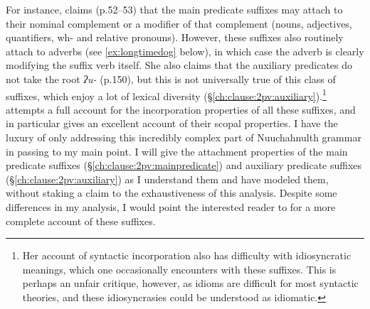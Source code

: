 For instance, \citeauthor{wojdak2005} claims (p.52--53) that the main predicate suffixes may attach to their nominal complement or a modifier of that complement (nouns, adjectives, quantifiers, wh- and relative pronouns). However, these suffixes also routinely attach to adverbs (see \ref{ex:longtimedog} below), in which case the adverb is clearly modifying the suffix verb itself. %
She also claims that the auxiliary predicates do not take the root \textit{ʔu-} (p.150), but this is not universally true of this class of suffixes, which enjoy a lot of lexical diversity (\S\ref{ch:clause:2pv:auxiliary}).\footnote{Her account of syntactic incorporation also has difficulty with idiosyncratic meanings, which one occasionally encounters with these suffixes. This is perhaps an unfair critique, however, as idioms are difficult for most syntactic theories, and these idiosyncrasies could be understood as idiomatic.} \citeauthor{wojdak2005} attempts a full account for the incorporation properties of all these suffixes, and in particular gives an excellent account of their scopal properties. I have the luxury of only addressing this incredibly complex part of Nuuchahnulth grammar in passing to my main point. I will give the attachment properties of the main predicate suffixes (\S\ref{ch:clause:2pv:mainpredicate}) and auxiliary predicate suffixes (\S\ref{ch:clause:2pv:auxiliary}) as I understand them and have modeled them, without staking a claim to the exhaustiveness of this analysis. Despite some differences in my analysis, I would point the interested reader to \cite{wojdak2005} for a more complete account of these suffixes.


